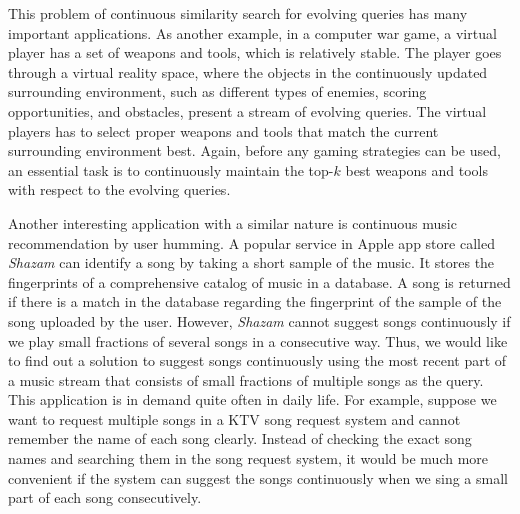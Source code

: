 This problem of continuous similarity search for evolving queries has many important applications.  As another example, in a computer war game, a virtual player has a set of weapons and tools, which is relatively stable.  The player goes through a virtual reality space, where the objects in the continuously updated surrounding environment, such as different types of enemies, scoring opportunities, and obstacles, present a stream of evolving queries.  The virtual players has to select proper weapons and tools that match the current surrounding environment best.  Again, before any gaming strategies can be used, an essential task is to continuously maintain the top-$k$ best weapons and tools with respect to the evolving queries.   

Another interesting application with a similar nature is continuous music recommendation by user humming.  A popular service in Apple app store called \emph{Shazam} can identify a song by taking a short sample of the music. It stores the fingerprints of a comprehensive catalog of music in a database. A song is returned if there is a match in the database regarding the fingerprint of the sample of the song uploaded by the user. However, \emph{Shazam} cannot suggest songs continuously if we play small fractions of several songs in a consecutive way. Thus, we would like to find out a solution to suggest songs continuously using the most recent part of a music stream that consists of small fractions of multiple songs as the query. This application is in demand quite often in daily life. For example, suppose we want to request multiple songs in a KTV song request system and cannot remember the name of each song clearly. Instead of checking the exact song names and searching them in the song request system, it would be much more convenient if the system can suggest the songs continuously when we sing a small part of each song consecutively.    





